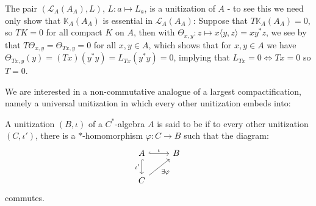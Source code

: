 \begin{example}
	The pair $(\mathcal{L}_A(A_A),L)$, $L\colon a \mapsto L_a$, is a unitization of $A$ - to see this we need only show that $\mathbb{K}_A(A_A)$ is essential in $\mathcal{L}_A(A_A)$: Suppose that $T \mathbb{K}_A(A_A)=0$, so $TK = 0$ for all compact $K$ on $A$, then with $\Theta_{x,y} \colon z \mapsto x\langle y,z\rangle = xy^*z$, we see by  that $T \Theta_{x,y}=\Theta_{Tx,y}= 0$ for all $x, y \in A$, which shows that for $x,y \in A$ we have $\Theta_{Tx,y}(y) = (Tx)(y^*y)=L_{Tx}(y^*y)=0$, implying that $L_{Tx}=0 \iff Tx = 0$ so $T=0$. 
	\label{mult:compess}
\end{example}
We are interested in a non-commutative analogue of a largest compactification, namely a universal unitization in which every other unitization embeds into:
\begin{definition}
	A unitization $(B, \iota)$ of a $C^*$-algebra $A$ is said to be  if to every other unitization $(C,\iota')$, there is a $*$-homomorphism $\varphi \colon C \to B$ such that the diagram:
	\begin{equation}
	\begin{tikzcd}
		A\arrow[d,"\iota'"', hook] \arrow[r, "\iota", hook] & B \\
		 C \arrow[ur, "\exists \varphi"']& 
	\end{tikzcd}
	\end{equation}
	commutes.
	\label{mult:defmaxun}
\end{definition}

